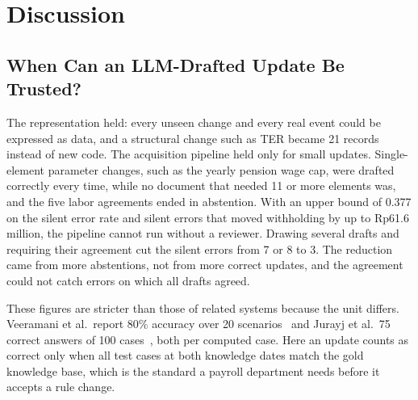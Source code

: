 \section{Discussion}
\label{sec:discussion}
\subsection{When Can an LLM-Drafted Update Be Trusted?}
The representation held: every unseen change and every real event could be expressed as data, and a structural change such as TER became 21 records instead of new code. The acquisition pipeline held only for small updates. Single-element parameter changes, such as the yearly pension wage cap, were drafted correctly every time, while no document that needed 11 or more elements was, and the five labor agreements ended in abstention. With an upper bound of 0.377 on the silent error rate and silent errors that moved withholding by up to Rp61.6 million, the pipeline cannot run without a reviewer. Drawing several drafts and requiring their agreement cut the silent errors from 7 or 8 to 3. The reduction came from more abstentions, not from more correct updates, and the agreement could not catch errors on which all drafts agreed.

These figures are stricter than those of related systems because the unit differs. Veeramani et al.\ report 80\% accuracy over 20 scenarios~\cite{veeramani2026neurosymbolic} and Jurayj et al.\ 75 correct answers of 100 cases~\cite{jurayj2026tax}, both per computed case. Here an update counts as correct only when all test cases at both knowledge dates match the gold knowledge base, which is the standard a payroll department needs before it accepts a rule change.

